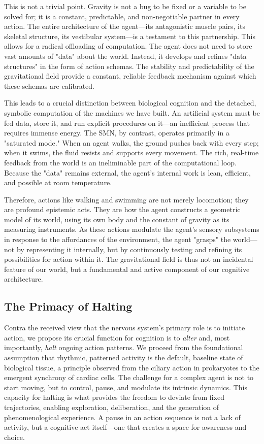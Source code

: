 This is not a trivial point. Gravity is not a bug to be fixed or a variable to be solved for; it is a constant, predictable, and non-negotiable partner in every action. The entire architecture of the agent—its antagonistic muscle pairs, its skeletal structure, its vestibular system—is a testament to this partnership. This allows for a radical offloading of computation. The agent does not need to store vast amounts of "data" about the world. Instead, it develops and refines "data structures" in the form of action schemas. The stability and predictability of the gravitational field provide a constant, reliable feedback mechanism against which these schemas are calibrated.

This leads to a crucial distinction between biological cognition and the detached, symbolic computation of the machines we have built. An artificial system must be fed data, store it, and run explicit procedures on it—an inefficient process that requires immense energy. The SMN, by contrast, operates primarily in a "saturated mode." When an agent walks, the ground pushes back with every step; when it swims, the fluid resists and supports every movement. The rich, real-time feedback from the world is an ineliminable part of the computational loop. Because the "data" remains external, the agent's internal work is lean, efficient, and possible at room temperature.

Therefore, actions like walking and swimming are not merely locomotion; they are profound epistemic acts. They are how the agent constructs a geometric model of its world, using its own body and the constant of gravity as its measuring instruments. As these actions modulate the agent's sensory subsystems in response to the affordances of the environment, the agent "grasps" the world—not by representing it internally, but by continuously testing and refining its possibilities for action within it. The gravitational field is thus not an incidental feature of our world, but a fundamental and active component of our cognitive architecture.

\subsection{The Primacy of Halting}
\label{subsec:halting}
Contra the received view that the nervous system's primary role is to initiate action, we propose its crucial function for cognition is to \textit{alter} and, most importantly, \textit{halt} ongoing action patterns. We proceed from the foundational assumption that rhythmic, patterned activity is the default, baseline state of biological tissue, a principle observed from the ciliary action in prokaryotes to the emergent synchrony of cardiac cells. The challenge for a complex agent is not to start moving, but to control, pause, and modulate its intrinsic dynamics. This capacity for halting is what provides the freedom to deviate from fixed trajectories, enabling exploration, deliberation, and the generation of phenomenological experience. A pause in an action sequence is not a lack of activity, but a cognitive act itself—one that creates a space for awareness and choice.

